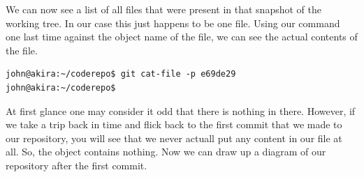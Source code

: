 We can now see a list of all files that were present in that snapshot of the working tree.  In our case this just happens to be one file.  Using our command one last time against the object name of the file, we can see the actual contents of the file.

\begin{Verbatim}[frame=leftline,framerule=1mm,fontsize=\relsize{-3}]
john@akira:~/coderepo$ git cat-file -p e69de29
john@akira:~/coderepo$
\end{Verbatim}

At first glance one may consider it odd that there is nothing in there.  However, if we take a trip back in time and flick back to the first commit that we made to our repository, you will see that we never actuall put any content in our file at all.  So, the object contains nothing.  Now we can draw up a diagram of our repository after the first commit.
